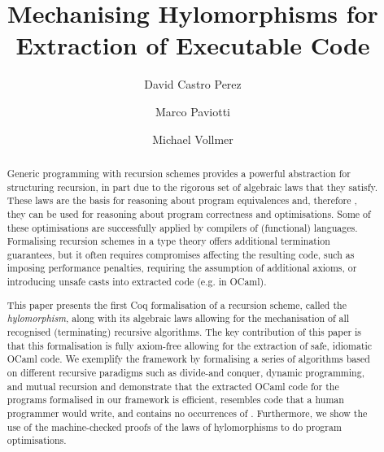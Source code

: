 \documentclass[a4paper,anonymous, UKenglish,cleveref, autoref, thm-restate]{lipics-v2021}
\title{Mechanising Hylomorphisms for Extraction of Executable Code}
\author{David {Castro Perez}}%
{University Of Kent, Canterbury, CT2 7NZ, United Kingdom}%
{D.Castro-Perez@kent.ac.uk}%
{0000-0002-6939-4189}%
{}
\author{Marco Paviotti}%
{University Of Kent, Canterbury, CT2 7NZ, United Kingdom}%
{M.Paviotti@kent.ac.uk}%
{0000-0002-1513-0807}%
{}
\author{Michael Vollmer}%
{University Of Kent, Canterbury, CT2 7NZ, United Kingdom}%
{M.Vollmer@kent.ac.uk}%
{0000-0002-0496-8268}%
{}
\begin{document}
\maketitle

\begin{abstract}
  Generic programming with recursion schemes provides a powerful abstraction for
structuring recursion, in part due to the rigorous set of algebraic laws that
they satisfy. These laws are the basis for reasoning about program equivalences
and, therefore , they can be used for reasoning about program correctness and
optimisations.  Some of these optimisations are successfully applied by
compilers of (functional) languages.  Formalising recursion schemes in a type
theory offers additional termination guarantees, but it often requires
compromises affecting the resulting code, such as imposing performance
penalties, requiring the assumption of additional axioms, or introducing unsafe
casts into extracted code (e.g.  in OCaml).

This paper presents the first Coq formalisation of a recursion scheme, called
the \emph{hylomorphism}, along with its algebraic laws allowing for the
mechanisation of all recognised (terminating) recursive algorithms. The key
contribution of this paper is that this formalisation is fully axiom-free
allowing for the extraction of safe, idiomatic OCaml code. We exemplify the
framework by formalising a series of algorithms based on different recursive
paradigms such as divide-and conquer, dynamic programming, and mutual recursion
and demonstrate that the extracted OCaml code for the programs formalised in our
framework is efficient, resembles code that a human programmer would write, and
contains no occurrences of .  Furthermore, we show the use of
the machine-checked proofs of the laws of hylomorphisms to do program
optimisations.
\end{abstract}
\end{document}
